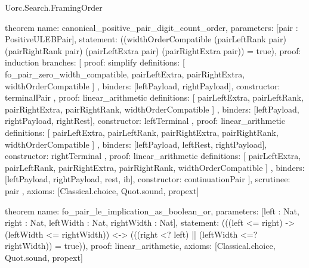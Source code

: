 \begin{lexlean}{Uorc.Search.FramingOrder}
\begin{semanticmodule}
theorem{
  name: canonical_positive_pair_digit_count_order,
  parameters: [pair : PositiveULEBPair],
  statement: ((widthOrderCompatible (pairLeftRank pair) (pairRightRank pair) (pairLeftExtra pair) (pairRightExtra pair)) = true),
  proof: induction{
    branches: [
      {
        proof: simplify{
          definitions: [
            fo_pair_zero_width_compatible,
            pairLeftExtra,
            pairRightExtra,
            widthOrderCompatible
          ]
        },
        binders: [leftPayload, rightPayload],
        constructor: terminalPair
      },
      {
        proof: linear_arithmetic{
          definitions: [
            pairLeftExtra,
            pairLeftRank,
            pairRightExtra,
            pairRightRank,
            widthOrderCompatible
          ]
        },
        binders: [leftPayload, rightPayload, rightRest],
        constructor: leftTerminal
      },
      {
        proof: linear_arithmetic{
          definitions: [
            pairLeftExtra,
            pairLeftRank,
            pairRightExtra,
            pairRightRank,
            widthOrderCompatible
          ]
        },
        binders: [leftPayload, leftRest, rightPayload],
        constructor: rightTerminal
      },
      {
        proof: linear_arithmetic{
          definitions: [
            pairLeftExtra,
            pairLeftRank,
            pairRightExtra,
            pairRightRank,
            widthOrderCompatible
          ]
        },
        binders: [leftPayload, rightPayload, rest, ih],
        constructor: continuationPair
      }
    ],
    scrutinee: pair
  },
  axioms: [Classical.choice, Quot.sound, propext]
}

theorem{
  name: fo_pair_le_implication_as_boolean_or,
  parameters: [left : Nat, right : Nat, leftWidth : Nat, rightWidth : Nat],
  statement: (((left <= right) -> (leftWidth <= rightWidth)) <-> (((right <? left) || (leftWidth <=? rightWidth)) = true)),
  proof: linear_arithmetic{},
  axioms: [Classical.choice, Quot.sound, propext]
}


\end{semanticmodule}
\end{lexlean}

